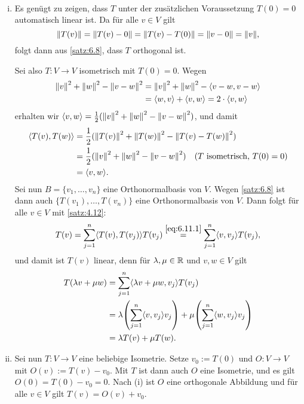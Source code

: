 \begin{beweis} \mbox{} \\[-.9cm]
	\begin{enumerate}[(i)]
		\item Es genügt zu zeigen, dass $T$ unter der zusätzlichen Voraussetzung $T(0) = 0$ automatisch linear ist.
		Da für alle $v \in V$ gilt
		\[
			\no{T(v)} = \no{T(v) - 0} = \no{T(v) - T(0)} = \no{v-0} = \no{v},
		\]
		folgt dann aus \autoref{satz:6.8}, dass $T$ orthogonal ist.
		
		Sei also $T \colon V \rightarrow V$ isometrisch mit $T(0) = 0$.
		Wegen
		\begin{align*}
			\left\lVert v\right\rVert^2 + \left\lVert w\right\rVert^2 - \left\lVert v-w\right\rVert^2 &= \left\lVert v\right\rVert^2 + \left\lVert w\right\rVert^2 - \left\langle v-w,v-w\right\rangle \\
			&= \left\langle w,v\right\rangle + \left\langle v,w\right\rangle = 2 \cdot \left\langle v,w\right\rangle
		\end{align*}
		erhalten wir $\left\langle v,w\right\rangle = \frac{1}{2} (\left\lVert v\right\rVert^2 + \left\lVert w\right\rVert^2 - \left\lVert v-w\right\rVert^2)$, und damit
		\begin{equation}
			\begin{aligned}
				\sk{T(v),T(w)} &= \frac{1}{2} (\no{T(v)}^2 + \no{T(w)}^2 - \no{T(v)-T(w)}^2) \\
				&= \frac{1}{2} (\no{v}^2 + \no{w}^2 - \no{v-w}^2) \quad (T \text{ isometrisch, } T(0)=0) \\
				&= \sk{v,w}.
			\end{aligned}
			\label{eq:6.11.1}
		\end{equation}
		Sei nun $B = \{v_1,\dots,v_n\}$ eine Orthonormalbasis von $V$.
		Wegen \autoref{satz:6.8} ist dann auch $\{T(v_1),\dots,T(v_n)\}$ eine Orthonormalbasis von $V$.
		Dann folgt für alle $v \in V$ mit \autoref{satz:4.12}:
		\[
			T(v) = \sum_{j=1}^{n} \sk{T(v),T(v_j)} T(v_j) \stackrel{\eqref{eq:6.11.1}}{=} \sum_{j=1}^{n} \sk{v,v_j} T(v_j),
		\]
		und damit ist $T(v)$ linear, denn für $\lambda,\mu \in \mathbb{R}$ und $v,w \in V$ gilt
		\begin{align*}
			T(\lambda v+\mu w) &= \sum_{j=1}^{n} \sk{\lambda v + \mu w,v_j} T(v_j) \\
			&= \lambda \enb{\sum_{j=1}^{n} \sk{v,v_j} v_j} + \mu \enb{\sum_{j=1}^{n} \sk{w,v_j} v_j} \\
			&= \lambda T(v) + \mu T(w).
		\end{align*}
		\item Sei nun $T \colon V \rightarrow V$ eine beliebige Isometrie.
		Setze $v_0 := T(0)$ und $O\colon V \rightarrow V$ mit $O(v) := T(v) - v_0$.
		Mit $T$ ist dann auch $O$ eine Isometrie, und es gilt $O(0) = T(0) - v_0 = 0$.
		Nach (i) ist $O$ eine orthogonale Abbildung und für alle $v \in V$ gilt $T(v) = O(v) + v_0$. \qedhere
	\end{enumerate}
\end{beweis}

